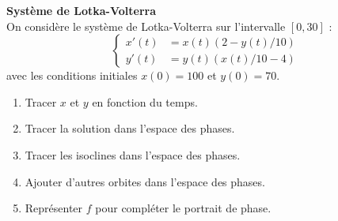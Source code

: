 \documentclass[12pt]{article}
\begin{document}
\begin{exo}\textbf{Syst\`eme de Lotka-Volterra}\\
On consid\`ere le syst\`eme de Lotka-Volterra sur l'intervalle $[0,30]$ :
$$
\left\{
\begin{array}{rl}
x'(t)&=x(t)(2-y(t)/10)\\
y'(t)&=y(t)(x(t)/10-4)
\end{array}
\right.
$$
avec les conditions initiales $x(0)=100$ et $y(0)=70$.
\begin{enumerate}
\item Tracer $x$ et $y$ en fonction du temps.
\item Tracer la solution dans l'espace des phases.
\item Tracer les isoclines dans l'espace des phases. 
\item Ajouter d'autres orbites dans l'espace des phases.
\item Repr\'esenter $f$ pour compl\'eter le portrait de phase.
\end{enumerate}
\end{exo}
\end{document}

